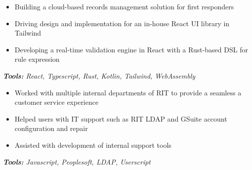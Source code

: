 \begin{itemize}
  \item Building a cloud-based records management solution for first responders
  \item Driving design and implementation for an in-house React UI library in Tailwind
  \item Developing a real-time validation engine in React with a Rust-based DSL for rule expression
\end{itemize}
\textit{\textbf{Tools:} React, Typescript, Rust, Kotlin, Tailwind, WebAssembly}

\divider

\begin{itemize}
  \item Worked with multiple internal departments of RIT to provide a seamless a customer service experience
  \item Helped users with IT support such as RIT LDAP and GSuite account configuration and repair
  \item Assisted with development of internal support tools
\end{itemize}
\textit{\textbf{Tools:} Javascript, Peoplesoft, LDAP, Userscript}